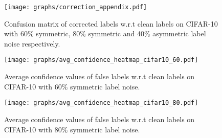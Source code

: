 \documentclass{article}
\begin{document}
\begin{table*}[htb!]
	\begin{center}
	\end{center}
	\caption{Correction accuracy (\%) on CIFAR-10 and CIFAR-100 with various levels of label noise injected to training set.}
	\label{table:correct_acc}
\end{table*}

\begin{figure}[t]
	\begin{center}
		\texttt{[image: graphs/correction\_appendix.pdf]}
	\end{center}
	\caption{Confusion matrix of corrected labels w.r.t clean labels on CIFAR-10 with 60\% symmetric, 80\% symmetric and 40\% asymmetric label noise respectively.}
	\label{fig:more_confumatrix}
\end{figure}

\begin{figure}[t]
	\centering
	\begin{minipage}[t]{0.45\textwidth}
		\centering
		\texttt{[image: graphs/avg\_confidence\_heatmap\_cifar10\_60.pdf]}
		\caption{Average confidence values  of false labels w.r.t clean labels on CIFAR-10 with 60\% symmetric label noise.}
		\label{fig:confidence_hm_60}
	\end{minipage}
	\hspace{0.5cm}
	\begin{minipage}[t]{0.45\textwidth}	
		\centering
		\texttt{[image: graphs/avg\_confidence\_heatmap\_cifar10\_80.pdf]}
		\caption{Average confidence values  of false labels w.r.t clean labels on CIFAR-10 with 80\% symmetric label noise.}
		\label{fig:confidence_hm_80}
	\end{minipage}
	\vspace{-0.9em}
\end{figure}
\end{document}
